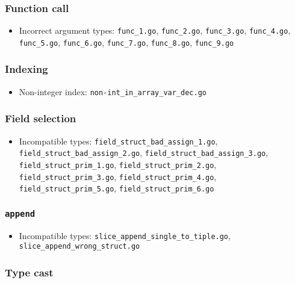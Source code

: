 \documentclass{article}
\begin{document}
\subsubsection{Function call}

\begin{itemize}
\item Incorrect argument types: \texttt{func\_1.go}, \texttt{func\_2.go}, \texttt{func\_3.go}, \texttt{func\_4.go}, \texttt{func\_5.go}, \texttt{func\_6.go}, \texttt{func\_7.go}, \texttt{func\_8.go}, \texttt{func\_9.go}
\end{itemize}

\subsubsection{Indexing}

\begin{itemize}
\item Non-integer index: \texttt{non-int\_in\_array\_var\_dec.go}

\end{itemize}

\subsubsection{Field selection}

\begin{itemize}
\item Incompatible types: \texttt{field\_struct\_bad\_assign\_1.go}, \texttt{field\_struct\_bad\_assign\_2.go}, \texttt{field\_struct\_bad\_assign\_3.go}, \texttt{field\_struct\_prim\_1.go}, \texttt{field\_struct\_prim\_2.go}, \texttt{field\_struct\_prim\_3.go}, \texttt{field\_struct\_prim\_4.go}, \texttt{field\_struct\_prim\_5.go}, \texttt{field\_struct\_prim\_6.go}
\end{itemize}

\subsubsection{\texttt{append}}

\begin{itemize}
\item Incompatible types: \texttt{slice\_append\_single\_to\_tiple.go}, \texttt{slice\_append\_wrong\_struct.go}
\end{itemize}

\subsubsection{Type cast}
\end{document}
